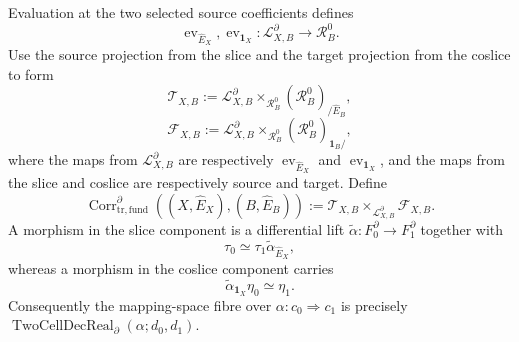 \begin{construction}
\label{constr:prequantum-decorated-hom-category}
Evaluation at the two selected source coefficients defines
\[
\operatorname{ev}_{\widehat E_X},\operatorname{ev}_{\mathbf1_X}:
\mathcal L_{X,B}^{\partial}\longrightarrow\mathcal R_B^0.
\]
Use the source projection from the slice and the target projection from the
coslice to form
\[
\mathcal T_{X,B}
:=
\mathcal L_{X,B}^{\partial}
\times_{\mathcal R_B^0}
(\mathcal R_B^0)_{/\widehat E_B},
\]
\[
\mathcal F_{X,B}
:=
\mathcal L_{X,B}^{\partial}
\times_{\mathcal R_B^0}
(\mathcal R_B^0)_{\mathbf1_B/},
\]
where the maps from $\mathcal L_{X,B}^{\partial}$ are respectively
$\operatorname{ev}_{\widehat E_X}$ and $\operatorname{ev}_{\mathbf1_X}$, and
the maps from the slice and coslice are respectively source and target.
Define
\[
\boxed{
\operatorname{Corr}^{\partial}_{\mathrm{tr,fund}}
((X,\widehat E_X),(B,\widehat E_B))
:=
\mathcal T_{X,B}
\times_{\mathcal L_{X,B}^{\partial}}
\mathcal F_{X,B}.
}
\]
A morphism in the slice component is a differential lift
$\widetilde\alpha:F_0^{\partial}\to F_1^{\partial}$ together with
\[
\tau_0\simeq\tau_1\widetilde\alpha_{\widehat E_X},
\]
whereas a morphism in the coslice component carries
\[
\widetilde\alpha_{\mathbf1_X}\eta_0\simeq\eta_1.
\]
Consequently the mapping-space fibre over
$\alpha:c_0\Rightarrow c_1$ is precisely
$\operatorname{TwoCellDecReal}_{\partial}(\alpha;d_0,d_1)$.
\end{construction}


